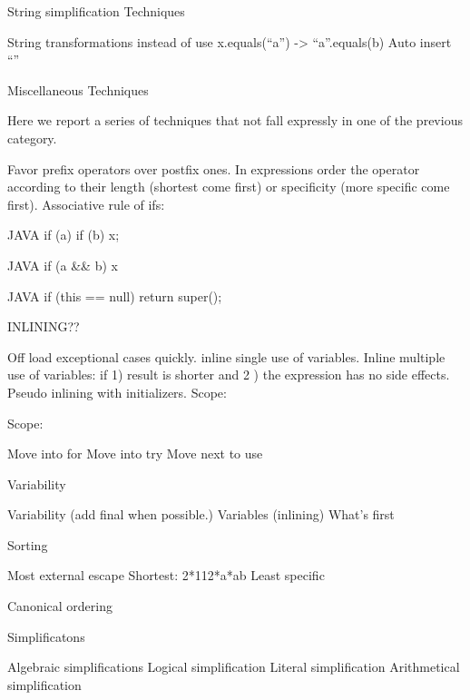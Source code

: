 \begin{description}
\item{String simplification Techniques}

    String transformations
    instead of  use 
    x.equals(“a”) -> “a”.equals(b)
    Auto insert “”

\item{Miscellaneous Techniques}

Here we report a series of techniques that not fall expressly in one of the
previous category.

    Favor prefix operators over postfix ones.
    In expressions order the operator according to their length (shortest
        come first) or specificity (more specific come first).
    Associative rule of ifs:
        \begin{code}{JAVA}
if (a) if (b) x;
  \end{code}
  \begin{code}{JAVA}
if (a && b) x
  \end{code}
  \begin{code}{JAVA}
if (this == null) return super();
  \end{code}

  INLINING??

      Off load exceptional cases quickly.
      inline single use of variables.
      Inline multiple use of variables: if 1) result is shorter and 2
) the expression has no side effects.
      Pseudo inlining with initializers.
      Scope:

  Scope:

      Move into for
      Move into try
      Move next to use

  Variability

      Variability (add final when possible.)
      Variables (inlining)
      What’s first

  Sorting

      Most external escape
      Shortest: 2*112*a*ab
      Least specific

  Canonical ordering

      Simplificatons

              Algebraic simplifications
              Logical simplification
              Literal simplification
              Arithmetical simplification


\end{description}
